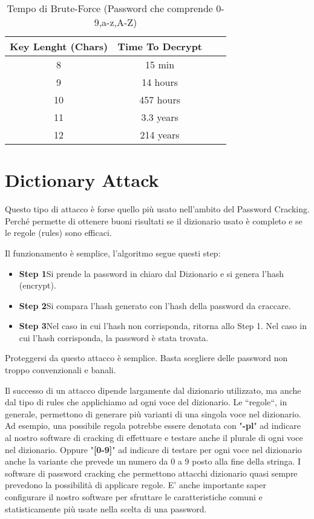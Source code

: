 \begin{table}[h]
    \centering
    \begin{tabular}{ |c|c|c|c| }
        \hline
        Key Lenght (Chars) & Time To Decrypt           \\
        \hline
        8    & 15 min \\
        \hline
        9    & 14 hours \\
        \hline
        10    & 457 hours \\
        \hline
        11    & 3.3 years \\
        \hline
        12    & 214 years \\
        \hline
    \end{tabular}
    \label{fig:brute}
    \caption{Tempo di Brute-Force (Password che comprende 0-9,a-z,A-Z)\cite{hashcrack}}
\end{table}

\section{Dictionary Attack}
Questo tipo di attacco \cite{Dictionary_attack} è forse quello più usato nell’ambito del Password Cracking. Perché permette di ottenere buoni risultati se il dizionario usato è completo e se le regole (rules) sono efficaci.

Il funzionamento è semplice, l’algoritmo segue questi step:
\begin{itemize}
    \item \textbf{Step 1}\newline Si prende la password in chiaro dal Dizionario e si genera l’hash (encrypt).
    \item \textbf{Step 2}\newline Si compara l’hash generato con l’hash della password da craccare.
    \item \textbf{Step 3}\newline Nel caso in cui l’hash non corrisponda, ritorna allo Step 1. \newline Nel caso in cui l’hash corrisponda, la password è stata trovata.
\end{itemize}

Proteggersi da questo attacco è semplice. Basta scegliere delle password non troppo convenzionali e banali.

Il successo di un attacco dipende largamente dal dizionario utilizzato, ma anche dal tipo di rules che applichiamo ad ogni voce del dizionario. Le “regole“, in generale, permettono di generare più varianti di una singola voce nel dizionario. Ad esempio, una possibile regola potrebbe essere denotata con "\textbf{-pl}" ad indicare al nostro software di cracking di effettuare e testare anche il plurale di ogni voce nel dizionario. Oppure "\textbf{[0-9]}" ad indicare di testare per ogni voce nel dizionario anche la variante che prevede un numero da 0 a 9 posto alla fine della stringa. I software di password cracking che permettono attacchi dizionario quasi sempre prevedono la possibilità di applicare regole. E’ anche importante saper configurare il nostro software per sfruttare le caratteristiche comuni e statisticamente più usate nella scelta di una password.

